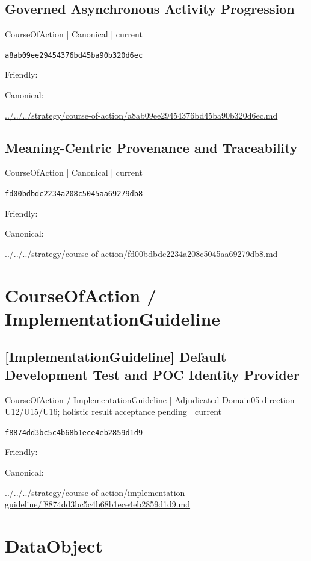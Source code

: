 \documentclass[10pt,a4paper]{article}
\begin{document}
\subsection*{Governed Asynchronous Activity Progression}
{\small CourseOfAction | Canonical | current}\par
\texttt{a8ab09ee29454376bd45ba90b320d6ec}\par
Friendly: \par
Canonical: \par
{\footnotesize\url{../../../strategy/course-of-action/a8ab09ee29454376bd45ba90b320d6ec.md}}\par
\subsection*{Meaning-Centric Provenance and Traceability}
{\small CourseOfAction | Canonical | current}\par
\texttt{fd00bdbdc2234a208c5045aa69279db8}\par
Friendly: \par
Canonical: \par
{\footnotesize\url{../../../strategy/course-of-action/fd00bdbdc2234a208c5045aa69279db8.md}}\par
\section*{CourseOfAction / ImplementationGuideline}
\subsection*{[ImplementationGuideline] Default Development Test and POC Identity Provider}
{\small CourseOfAction / ImplementationGuideline | Adjudicated Domain05 direction — U12/U15/U16; holistic result acceptance pending | current}\par
\texttt{f8874dd3bc5c4b68b1ece4eb2859d1d9}\par
Friendly: \par
Canonical: \par
{\footnotesize\url{../../../strategy/course-of-action/implementation-guideline/f8874dd3bc5c4b68b1ece4eb2859d1d9.md}}\par
\section*{DataObject}
\end{document}
